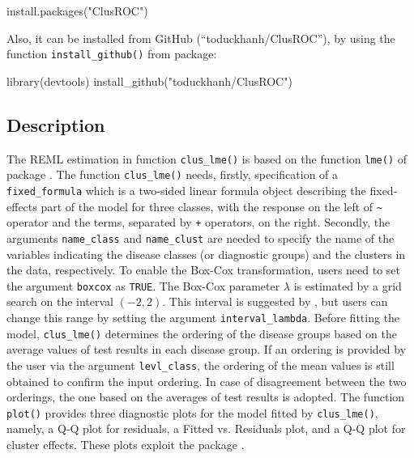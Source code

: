 \begin{example}
  install.packages("ClusROC")
\end{example}
Also, it can be installed from GitHub (``toduckhanh/ClusROC''), by using
the function \texttt{install\_github()} from  package:


\begin{example}
  library(devtools)
  install_github("toduckhanh/ClusROC")
\end{example}


\hypertarget{description}{%
\subsection{Description}\label{description}}

The REML estimation in function {\texttt{clus\_lme()}} is based on the function \texttt{lme()} of package  \citep{nlme}. The function {\texttt{clus\_lme()}} needs, firstly, specification of a {\texttt{fixed\_formula}} which is a two-sided linear formula object describing the fixed-effects part of the model for three classes, with the response on the left of \texttt{\textasciitilde{}} operator and the terms, separated by \texttt{+} operators, on the right. Secondly, the arguments {\texttt{name\_class}} and {\texttt{name\_clust}} are needed to specify the name of the variables indicating the disease classes (or diagnostic groups) and the clusters in the data, respectively. To enable the Box-Cox transformation, users need to set the argument \texttt{boxcox} as \texttt{TRUE}. The Box-Cox parameter $\lambda$ is estimated by a grid search on the interval $(-2, 2)$. This interval is suggested by \citet{gurka2011estimating}, but users can change this range by setting the argument \texttt{interval\_lambda}. Before fitting the model, {\texttt{clus\_lme()}} determines the ordering of the disease groups based on the average values of test results in each disease group. If an ordering is provided by the user via the argument {\texttt{levl\_class}}, the ordering of the mean values is still obtained to confirm the input ordering. In case of disagreement between the two orderings, the one based on the averages of test results is adopted. The function \texttt{plot()} provides three diagnostic plots for the model fitted by {\texttt{clus\_lme()}}, namely, a Q-Q plot for residuals, a Fitted vs. Residuals plot, and a Q-Q plot for cluster effects. These plots exploit the  package \citep{ggplot2}.

